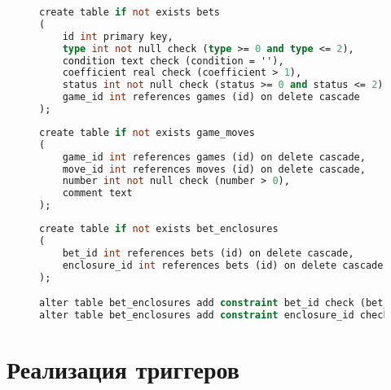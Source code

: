 \begin{figure}[H]
	\begin{lstlisting}[label=bets_lst,caption=Описание сущности bets,language=Caml]
create table if not exists bets
(
    id int primary key,
    type int not null check (type >= 0 and type <= 2),
    condition text check (condition = ''),
    coefficient real check (coefficient > 1),
    status int not null check (status >= 0 and status <= 2),
    game_id int references games (id) on delete cascade
);
	\end{lstlisting}
\end{figure}
\begin{figure}[H]
	\begin{lstlisting}[label=game_moves_lst,caption=Описание сущности game\_moves,language=Caml]
create table if not exists game_moves
(
    game_id int references games (id) on delete cascade,
    move_id int references moves (id) on delete cascade,
    number int not null check (number > 0),
    comment text
);
	\end{lstlisting}
\end{figure}
\begin{figure}[H]
	\begin{lstlisting}[label=bet_enclosures_lst,caption=Описание сущности bet\_enclosures,language=Caml]
create table if not exists bet_enclosures
(
    bet_id int references bets (id) on delete cascade,
    enclosure_id int references bets (id) on delete cascade
);

alter table bet_enclosures add constraint bet_id check (bet_id != enclosure_id);
alter table bet_enclosures add constraint enclosure_id check (bet_id != enclosure_id);
	\end{lstlisting}
\end{figure}

\section{Реализация триггеров}

